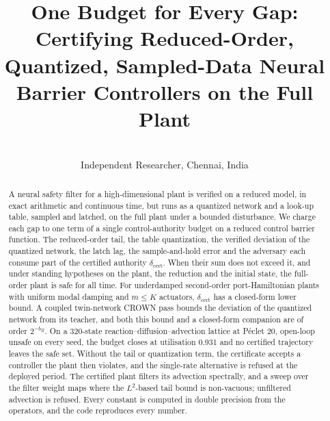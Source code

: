 


\title[One Budget for Every Gap]{One Budget for Every Gap: Certifying Reduced-Order, Quantized, Sampled-Data Neural Barrier Controllers on the Full Plant}
\author{\\ \addr Independent Researcher, Chennai, India}


\maketitle

\begin{abstract}
A neural safety filter for a high-dimensional plant is verified on a reduced model, in exact arithmetic and continuous time, but runs as a quantized network and a look-up table, sampled and latched, on the full plant under a bounded disturbance. We charge each gap to one term of a single control-authority budget on a reduced control barrier function. The reduced-order tail, the table quantization, the verified deviation of the quantized network, the latch lag, the sample-and-hold error and the adversary each consume part of the certified authority $\delta_{\mathrm{cert}}$. When their sum does not exceed it, and under standing hypotheses on the plant, the reduction and the initial state, the full-order plant is safe for all time. For underdamped second-order port-Hamiltonian plants with uniform modal damping and $m \le K$ actuators, $\delta_{\mathrm{cert}}$ has a closed-form lower bound. A coupled twin-network CROWN pass bounds the deviation of the quantized network from its teacher, and both this bound and a closed-form companion are of order $2^{-b_B}$. On a 320-state reaction--diffusion--advection lattice at P\'eclet 20, open-loop unsafe on every seed, the budget closes at utilisation 0.931 and no certified trajectory leaves the safe set. Without the tail or quantization term, the certificate accepts a controller the plant then violates, and the single-rate alternative is refused at the deployed period. The certified plant filters its advection spectrally, and a sweep over the filter weight maps where the $L^2$-based tail bound is non-vacuous; unfiltered advection is refused. Every constant is computed in double precision from the operators, and the code reproduces every number.
\end{abstract}

